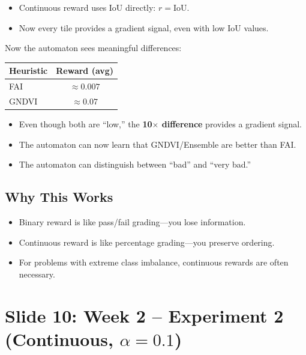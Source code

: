 \documentclass[11pt]{article}
\newenvironment{talkingpoints}{%
  \begin{itemize}[leftmargin=1.5em, itemsep=0.3em]
}{%
  \end{itemize}
}
\begin{document}
\begin{talkingpoints}
  \item Continuous reward uses IoU directly: $r = \text{IoU}$.
  \item Now every tile provides a gradient signal, even with low IoU values.
\end{talkingpoints}

Now the automaton sees meaningful differences:

\begin{center}
\begin{tabular}{lc}
\toprule
\textbf{Heuristic} & \textbf{Reward (avg)} \\
\midrule
FAI & $\approx 0.007$ \\
GNDVI & $\approx 0.07$ \\
\bottomrule
\end{tabular}
\end{center}

\begin{talkingpoints}
  \item Even though both are ``low,'' the \textbf{10$\times$ difference} provides a gradient signal.
  \item The automaton can now learn that GNDVI/Ensemble are better than FAI.
  \item The automaton can distinguish between ``bad'' and ``very bad.''
\end{talkingpoints}

\subsection{Why This Works}

\begin{talkingpoints}
  \item Binary reward is like pass/fail grading---you lose information.
  \item Continuous reward is like percentage grading---you preserve ordering.
  \item For problems with extreme class imbalance, continuous rewards are often necessary.
\end{talkingpoints}

\section{Slide 10: Week 2 -- Experiment 2 (Continuous, $\alpha=0.1$)}
\end{document}
